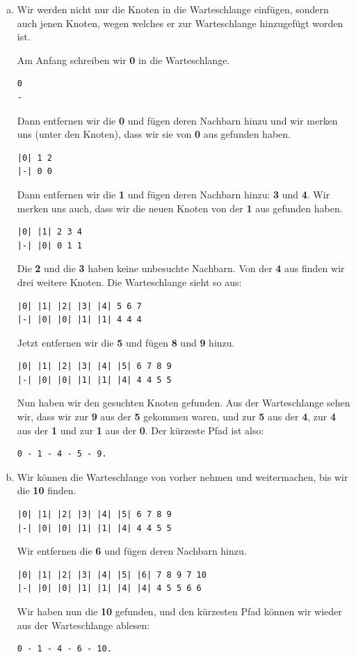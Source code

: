 \begin{enumerate}[(a)]
\item Wir werden nicht nur die Knoten in die Warteschlange einfügen, sondern auch jenen Knoten, wegen welches er zur Warteschlange hinzugefügt worden ist.

Am Anfang schreiben wir \textbf{0} in die Warteschlange.
\begin{lstlisting}[mathescape]
0
-
\end{lstlisting}
Dann entfernen wir die \textbf{0} und fügen deren Nachbarn hinzu und wir merken uns (unter den Knoten), dass wir sie von \textbf{0} aus gefunden haben.
\begin{lstlisting}[mathescape]
|0| 1 2
|-| 0 0
\end{lstlisting}
Dann entfernen wir die \textbf{1} und fügen deren Nachbarn hinzu: \textbf{3} und \textbf{4}. Wir merken uns auch, dass wir die neuen Knoten von der \textbf{1} aus gefunden haben.
\begin{lstlisting}[mathescape]
|0| |1| 2 3 4
|-| |0| 0 1 1
\end{lstlisting}
Die \textbf{2} und die \textbf{3} haben keine unbesuchte Nachbarn. Von der \textbf{4} aus finden wir drei weitere Knoten. Die Warteschlange sieht so aus:
\begin{lstlisting}[mathescape]
|0| |1| |2| |3| |4| 5 6 7
|-| |0| |0| |1| |1| 4 4 4
\end{lstlisting}
Jetzt entfernen wir die \textbf{5} und fügen \textbf{8} und \textbf{9} hinzu.
\begin{lstlisting}[mathescape]
|0| |1| |2| |3| |4| |5| 6 7 8 9
|-| |0| |0| |1| |1| |4| 4 4 5 5
\end{lstlisting}
Nun haben wir den gesuchten Knoten gefunden. Aus der Warteschlange sehen wir, dass wir zur \textbf{9} aus der \textbf{5} gekommen waren, und zur \textbf{5} aus der \textbf{4}, zur \textbf{4} aus der \textbf{1} und zur \textbf{1} aus der \textbf{0}. Der kürzeste Pfad ist also:
\begin{lstlisting}[mathescape]
0 - 1 - 4 - 5 - 9.
\end{lstlisting}

\item Wir können die Warteschlange von vorher nehmen und weitermachen, bis wir die \textbf{10} finden.
\begin{lstlisting}[mathescape]
|0| |1| |2| |3| |4| |5| 6 7 8 9
|-| |0| |0| |1| |1| |4| 4 4 5 5
\end{lstlisting}
Wir entfernen die \textbf{6} und fügen deren Nachbarn hinzu.
\begin{lstlisting}[mathescape]
|0| |1| |2| |3| |4| |5| |6| 7 8 9 7 10
|-| |0| |0| |1| |1| |4| |4| 4 5 5 6 6
\end{lstlisting}
Wir haben nun die \textbf{10} gefunden, und den kürzesten Pfad können wir wieder aus der Warteschlange ablesen:
\begin{lstlisting}[mathescape]
0 - 1 - 4 - 6 - 10.
\end{lstlisting}


\end{enumerate}
